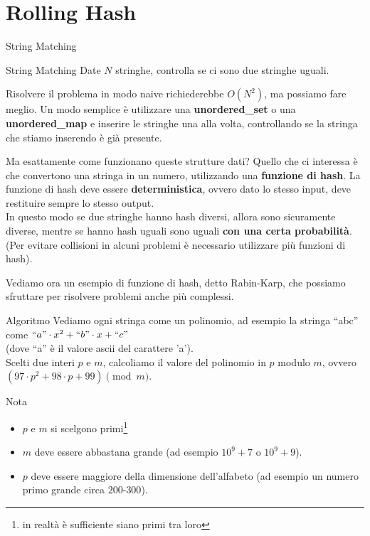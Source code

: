 \documentclass[compress]{beamer}
\begin{document}
\section{Rolling Hash}
\begin{frame}{String Matching}
    \begin{exampleblock}{String Matching}
        Date $N$ stringhe, controlla se ci sono due stringhe uguali.
    \end{exampleblock}
    \pause
    Risolvere il problema in modo naive richiederebbe $O(N^2)$, ma possiamo fare meglio.
    \pause
    \vfill
    Un modo semplice \`e utilizzare una \textbf{unordered\_set} o una \textbf{unordered\_map} e inserire le stringhe una alla volta, 
    controllando se la stringa che stiamo inserendo \`e gi\`a presente.
\end{frame}

\begin{frame}
    Ma esattamente come funzionano queste strutture dati?
    \vfill
    \pause
    Quello che ci interessa \`e che convertono una stringa in un numero, utilizzando una \textbf{funzione di hash}.
    La funzione di hash deve essere \textbf{deterministica}, ovvero dato lo stesso input, deve restituire sempre lo stesso output.\\
    \pause
    \vfill
    In questo modo se due stringhe hanno hash diversi, allora sono sicuramente diverse, 
    mentre se hanno hash uguali sono uguali \textbf{con una certa probabilit\`a}.\\
    \pause
    (Per evitare collisioni in alcuni problemi \`e necessario utilizzare pi\`u funzioni di hash).
\end{frame}

\begin{frame}
    Vediamo ora un esempio di funzione di hash, detto Rabin-Karp, che possiamo sfruttare per risolvere problemi anche pi\`u
    complessi.
    \pause
     \begin{exampleblock}{Algoritmo}
        Vediamo ogni stringa come un polinomio, ad esempio la stringa ``abc'' come $``a" \cdot x^2 + ``b" \cdot x + ``c"$ \\
        (dove ``a'' \`e il valore ascii del carattere 'a').\\
        \pause
        Scelti due interi $p$ e $m$, calcoliamo il valore del polinomio in $p$ modulo $m$, ovvero $(97 \cdot p^2 + 98 \cdot p + 99) \pmod m$.
    \end{exampleblock}
    \begin{alertblock}{Nota}
        \begin{itemize}
            \item $p$ e $m$ si scelgono primi\footnote{in realt\`a \`e sufficiente siano primi tra loro}\\
            \item $m$ deve essere abbastana grande (ad esempio $10^9 + 7$ o $10^9 + 9$).\\
            \item $p$ deve essere maggiore della dimensione dell'alfabeto (ad esempio un numero primo grande circa $200$-$300$).
        \end{itemize}
    \end{alertblock}
\end{frame}
\end{document}
